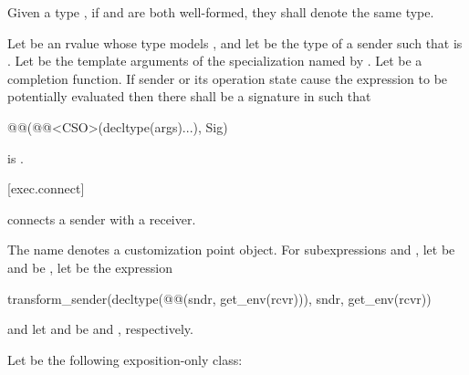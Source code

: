 \pnum
Given a type , if
 and
are both well-formed,
they shall denote the same type.

\pnum
Let  be an rvalue
whose type  models , and
let  be the type of a sender
such that  is .
Let  be the template arguments of
the  specialization
named by .
Let  be a completion function.
If sender  or its operation state cause
the expression 
to be potentially evaluated
then there shall be a signature  in 
such that
\begin{codeblock}
@@(@@<CSO>(decltype(args)...), Sig)
\end{codeblock}
is .

[exec.connect]{}

\pnum
{} connects a sender with a receiver.

\pnum
The name  denotes a customization point object.
For subexpressions  and ,
let  be  and
 be ,
let  be the expression
\begin{codeblock}
transform_sender(decltype(@@(sndr, get_env(rcvr))){}, sndr, get_env(rcvr))
\end{codeblock}
and let  and  be
 and , respectively.

\pnum
Let  be the following exposition-only class:

